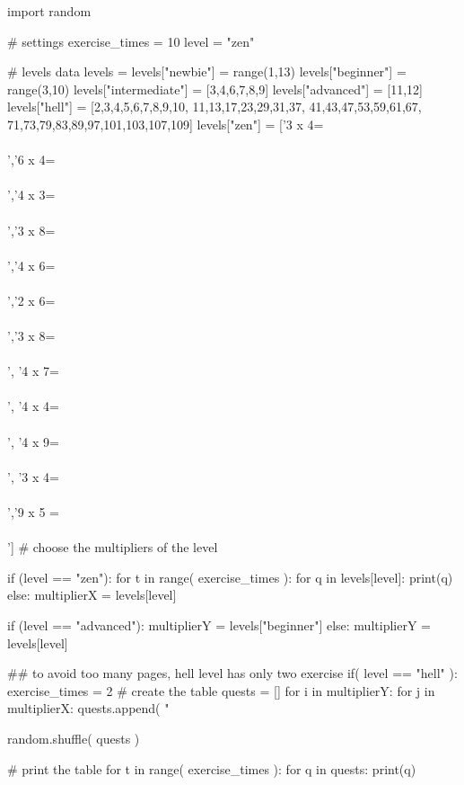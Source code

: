 \documentclass{article}
\begin{document}
\begin{multicols}{6}

\large
{}
\noindent 
\begin{pycode}
import random

# settings 
exercise_times = 10
level = "zen"

# levels data
levels = {}
levels["newbie"]   = range(1,13)
levels["beginner"] = range(3,10)
levels["intermediate"] = [3,4,6,7,8,9]
levels["advanced"]     = [11,12]
levels["hell"] = [2,3,4,5,6,7,8,9,10,
                  11,13,17,23,29,31,37,
                  41,43,47,53,59,61,67,
                  71,73,79,83,89,97,101,103,107,109]
levels["zen"]  = ['3 x 4=\\\\','6 x 4=\\\\','4 x 3=\\\\','3 x 8=\\\\','4 x 6=\\\\','2 x 6=\\\\','3 x 8=\\\\', '4 x 7=\\\\', '4 x 4=\\\\', '4 x 9=\\\\', '3 x 4=\\\\','9 x 5 =\\\\']
# choose the multipliers of the level

if (level == "zen"):
    for t in range( exercise_times ):
        for q in levels[level]:
            print(q)
else:
    multiplierX = levels[level]

    if (level == "advanced"):
        multiplierY = levels["beginner"]
    else:
        multiplierY = levels[level]

    ## to avoid too many pages, hell level has only two exercise
    if( level == "hell" ):
        exercise_times = 2  
    # create the table
    quests = []
    for i in multiplierY:
        for j in multiplierX:
            quests.append( "%

    random.shuffle( quests )

    # print the table
    for t in range( exercise_times ):
        for q in quests:
            print(q)

\end{pycode}
\end{multicols}
\end{document}
